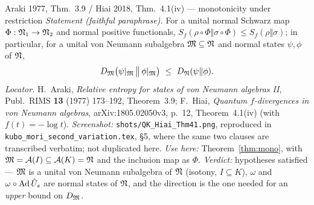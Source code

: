 \documentclass[11pt]{article}
\begin{document}
\begin{citedbox}{Araki 1977, Thm.~3.9 / Hiai 2018, Thm.~4.1(iv) --- monotonicity under restriction}
\emph{Statement (faithful paraphrase).}  For a unital normal Schwarz map $\Phi:\mathfrak N_1\to\mathfrak N_2$ and normal
positive functionals, $S_f(\rho\circ\Phi\Vert\sigma\circ\Phi)\le S_f(\rho\Vert\sigma)$; in particular, for a
unital von Neumann subalgebra $\mathfrak M\subseteq\mathfrak N$ and normal states $\psi,\phi$ of $\mathfrak N$,
\[
 D_{\cM}\bigl(\psi|_{\cM}\,\big\Vert\,\phi|_{\cM}\bigr)\ \le\ D_{\cN}(\psi\Vert\phi).
\]
\emph{Locator.}  H.~Araki, \emph{Relative entropy for states of von Neumann algebras II}, Publ.\ RIMS
\textbf{13} (1977) 173--192, Theorem~3.9; F.~Hiai, \emph{Quantum $f$-divergences in von Neumann algebras},
arXiv:1805.02050v3, p.~12, Theorem~4.1(iv) (with $f(t)=-\log t$).
\emph{Screenshot:} \texttt{shots/QK\_Hiai\_Thm41.png}, reproduced in
\texttt{kubo\_mori\_second\_variation.tex}, \S5, where the same two clauses are transcribed verbatim; not
duplicated here.
\emph{Use here:} Theorem~\ref{thm:mono}, with $\mathfrak M=\mathcal A(I)\subseteq\mathcal A(K)=\mathfrak N$ and the inclusion map as
$\Phi$.  \emph{Verdict:} hypotheses satisfied --- $\mathfrak M$ is a unital von Neumann subalgebra of $\mathfrak N$
(isotony, $I\subseteq K$), $\omega$ and $\omega\circ\operatorname{Ad}\hat U_s$ are normal states of $\mathfrak N$, and the
direction is the one needed for an \emph{upper} bound on $D_{\mathfrak M}$.
\end{citedbox}
\end{document}
